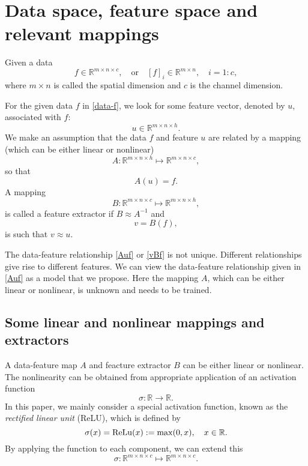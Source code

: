 \section{Data space, feature space and relevant mappings}\label{sec:spaces}
Given a data
\begin{equation}
	\label{data-f}
	f \in \mathbb{R}^{m \times n \times c}, 
	\quad \text{or}\quad [f]_i \in
	\mathbb{R}^{m\times n}, \quad i = 1:c,
\end{equation}
where $m\times n$ is called the spatial dimension and $c$ is the 
channel dimension.

For the given data $f$ in \eqref{data-f}, we look for some
feature vector, denoted by $u$,  associated with $f$:
\begin{equation}
	\label{u}
	u \in \mathbb{R}^{m \times n \times h}.
\end{equation}
We make an assumption that the data $f$ and feature $u$ are related by a mapping 
(which can be either linear or nonlinear)
\begin{equation}
	\label{u}
	A:  \mathbb{R}^{m \times n \times h}\mapsto \mathbb{R}^{m \times n \times c}, 
\end{equation}
so that
\begin{equation}
	\label{Auf}
	A(u)=f. 
\end{equation}
A mapping 
\begin{equation*}
	B : \mathbb{R}^{m\times n\times c} \mapsto \mathbb{R}^{m \times n\times h},
\end{equation*}
is called a feature extractor if $B \approx A^{-1}$ and 
\begin{equation}\label{vBf}
	v = B(f),
\end{equation}
is such that $v \approx u$.

The data-feature relationship \eqref{Auf} or \eqref{vBf} is not
unique.   Different relationships give rise to different features. 
We can view the data-feature relationship given in \eqref{Auf}
as a model that we propose.  Here the mapping $A$, which can be either
linear or nonlinear, is unknown and needs to be trained.  


\subsection{Some linear and nonlinear mappings and extractors}
A data-feature map $A$ and feacture extractor $B$ can be either
linear or nonlinear.   The nonlinearity can be obtained from
appropriate application of an activation function
\begin{equation}
	\label{act}
	\sigma: \mathbb{R} \to \mathbb{R} .
\end{equation}
In this paper, we mainly consider a special activation function, known 
as the {\it rectified linear unit} (ReLU), which is defined by
\begin{equation}
	\label{relu}
	\sigma(x)= {\rm ReLu}(x) :=\max(0,x), \quad x\in\mathbb{R}. 
\end{equation}
By applying the function to each component, we can extend this
\begin{equation}
	\label{vector-act}
	\sigma:\mathbb R^{m\times n\times c}\mapsto \mathbb R^{m\times n\times c}.  
\end{equation}


